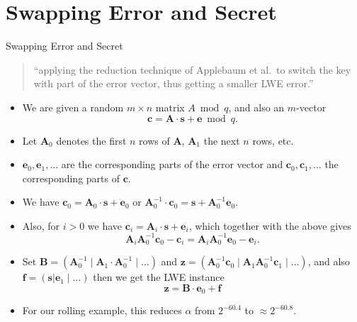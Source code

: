 \documentclass[10pt,compress]{beamer}
\renewcommand{\vec}[1]{\mathbf{#1}\xspace}
\renewcommand{\vec}[1]{\mathbf{#1}\xspace}
\begin{document}
\section{Swapping Error and Secret}

\begin{frame}{Swapping Error and Secret}

  \begin{quote}
    ``applying the reduction technique of Applebaum et al.\ to switch the key with part of the error vector, thus getting a smaller LWE error.''    
  \end{quote}

  \vspace{1em}



  \framebreak{}

  \begin{itemize}
  \item We are given a random $m × n$ matrix $A \bmod q$, and also an $m$-vector
    \[\vec{c} = \vec{A} ⋅ \vec{s} + \vec{e} \bmod q.\]
  \item Let $\vec{A}_0$ denotes the first $n$ rows of $\vec{A}$, $\vec{A}_1$ the next $n$ rows, etc.
  \item
    $\vec{e}_0, \vec{e}_1, \dots$ are the corresponding parts of the error vector and $\vec{c}_0 , \vec{c}_1, \dots$ the corresponding parts of $\vec{c}$. 
  \item   We have $\vec{c}_0 = \vec{A}_0 \cdot \vec{s}  + \vec{e}_0$ or $\vec{A}_0^{-1} \cdot \vec{c}_0 = \vec{s} + \vec{A}_0^{-1} \vec{e}_0$. 
  \item Also, for $i > 0$ we have $\vec{c}_i = \vec{A}_i \cdot \vec{s} + \vec{e}_i$,
    which together with the above gives \[\vec{A}_i \vec{A}_0^{-1} \vec{c}_0 - \vec{c}_i = \vec{A}_i \vec{A}_0^{-1} \vec{e}_0 - \vec{e}_i.\]

    \framebreak{}

  \item Set $\vec{B}  = (\vec{A}_0^{-1}\mid \vec{A}_1 ⋅ \vec{A}_0^{-1}\mid \dots)$
    and $\vec{z} = (\vec{A}_0^{-1} \vec{c}_0 \mid \vec{A}_1 \vec{A}_0^{-1} \vec{c}_1 \mid \ldots)$, and also $\vec{f} = (\vec{s}|\vec{e}_1 \mid \dots)$ then we get the
    LWE instance
    \[\vec{z} = \vec{B} ⋅ \vec{e}_0  + \vec{f}\]
  \item For our rolling example, this reduces $α$ from $2^{-60.4}$ to $≈2^{-60.8}$.
  \end{itemize}


\end{frame}
\end{document}
